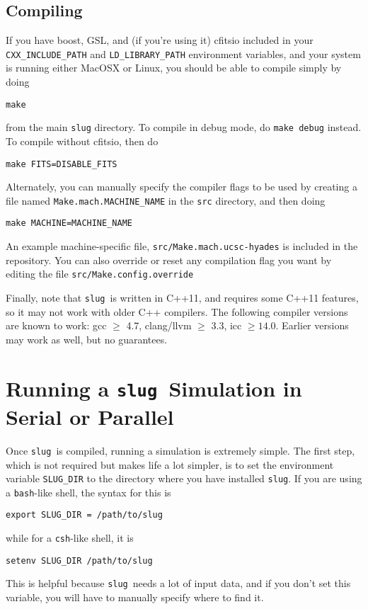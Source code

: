 \documentclass[12pt]{article}
\newcommand{\slug}{\texttt{slug}}
\begin{document}
\subsection{Compiling}

If you have boost, GSL, and (if you're using it) cfitsio included in your \verb=CXX_INCLUDE_PATH= and \verb=LD_LIBRARY_PATH= environment variables, and your system is running either MacOSX or Linux, you should be able to compile simply by doing
\begin{verbatim}
make
\end{verbatim}
from the main \verb=slug= directory. To compile in debug mode, do \verb=make debug= instead. To compile without cfitsio, then do
\begin{verbatim}
make FITS=DISABLE_FITS
\end{verbatim}

Alternately, you can manually specify the compiler flags to be used by creating a file named \verb=Make.mach.MACHINE_NAME= in the \verb=src= directory, and then doing
\begin{verbatim}
make MACHINE=MACHINE_NAME
\end{verbatim}
An example machine-specific file, \verb=src/Make.mach.ucsc-hyades= is included in the repository. You can also override or reset any compilation flag you want by editing the file \verb=src/Make.config.override=

Finally, note that \slug\ is written in C++11, and requires some C++11 features, so it may not work with older C++ compilers. The following compiler versions are known to work: gcc $\geq$ 4.7, clang/llvm $\geq$ 3.3, icc $\geq 14.0$. Earlier versions may work as well, but no guarantees.

\section{Running a \slug\ Simulation in Serial or Parallel}

Once \slug\ is compiled, running a simulation is extremely simple. The first step, which is not required but makes life a lot simpler, is to set the environment variable \verb=SLUG_DIR= to the directory where you have installed \slug. If you are using a \verb=bash=-like shell, the syntax for this is
\begin{verbatim}
export SLUG_DIR = /path/to/slug
\end{verbatim}
while for a \verb=csh=-like shell, it is
\begin{verbatim}
setenv SLUG_DIR /path/to/slug
\end{verbatim}
This is helpful because \slug\ needs a lot of input data, and if you don't set this variable, you will have to manually specify where to find it.
\end{document}
